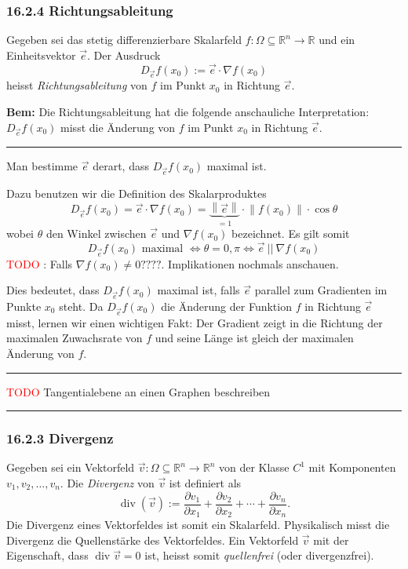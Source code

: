 \documentclass[a4paper,landscape,8pt]{extarticle}
\newcommand{\R}{\mathbb{R}}
\newcommand{\norm}[1]{\left\lVert #1 \right\rVert}
\newcommand{\todo}{\textcolor{red}{TODO }}
\newcommand{\sep}{\vspace{5pt}\noindent\hrule\vspace{5pt}}
\newcommand{\Bem}{\textbf{Bem: }}
\renewcommand\div{\operatorname{div}}
\begin{document}
\begin{multicols*}{4}
\subsubsection{16.2.4 Richtungsableitung}

\Def Gegeben sei das stetig differenzierbare Skalarfeld
$f\colon\Omega\subseteq\R^n\to\R$ und ein Einheitsvektor $\vec{e}$. Der Ausdruck
\[
D_{\vec{e}}f(x_0) := \vec{e}\cdot \nabla f(x_0)
\]
heisst \emph{Richtungsableitung} von $f$ im Punkt $x_0$ in Richtung $\vec{e}$.

\Bem Die Richtungsableitung hat die folgende anschauliche Interpretation:
$D_{\vec{e}}f(x_0)$ misst die Änderung von $f$ im Punkt $x_0$ in Richtung
$\vec{e}$.

\sep

\Bsp Man bestimme $\vec{e}$ derart, dass $D_{\vec{e}}f(x_0)$ maximal ist.

Dazu benutzen wir die Definition des Skalarproduktes
\[
D_{\vec{e}}f(x_0) = \vec{e}\cdot \nabla f(x_0) =
\underbrace{\norm{\vec{e}}}_{=1}\cdot \norm{f(x_0)}\cdot \cos \theta
\]
wobei $\theta$ den Winkel zwischen $\vec{e}$ und $\nabla f(x_0)$ bezeichnet. Es
gilt somit
\[
D_{\vec{e}}f(x_0) \text{ maximal } \Longleftrightarrow \theta = 0, \pi
\Longleftrightarrow \vec{e} \ || \ \nabla f(x_0)
\]
\todo: Falls $\nabla f(x_0)\neq 0????$. Implikationen nochmals anschauen.

Dies bedeutet, dass $D_{\vec{e}}f(x_0)$ maximal ist, falls $\vec{e}$ parallel
zum Gradienten im Punkte $x_0$ steht. Da $D_{\vec{e}}f(x_0)$ die Änderung der
Funktion $f$ in Richtung $\vec{e}$ misst, lernen wir einen wichtigen Fakt: Der
Gradient zeigt in die Richtung der maximalen Zuwachsrate von $f$ und seine Länge
ist gleich der maximalen Änderung von $f$.

\sep

\begin{warmup}
\todo Tangentialebene an einen Graphen beschreiben
\sep
\end{warmup}

\subsubsection{16.2.3 Divergenz}

\Def Gegeben sei ein Vektorfeld $\vec{v}\colon\Omega\subseteq\R^n\to\R^n$ von
der Klasse $C^1$ mit Komponenten $v_1,v_2,\ldots,v_n$. Die \emph{Divergenz} von
$\vec{v}$ ist definiert als
\[
\div(\vec{v}) := 
\frac{\partial{v_1}}{\partial{x_1}} +
\frac{\partial{v_2}}{\partial{x_2}} + \cdots +
\frac{\partial{v_n}}{\partial{x_n}}.
\]
Die Divergenz eines Vektorfeldes ist somit ein Skalarfeld. Physikalisch misst
die Divergenz die Quellenstärke des Vektorfeldes. Ein Vektorfeld $\vec{v}$ mit
der Eigenschaft, dass $\div{\vec{v}}=0$ ist, heisst somit \emph{quellenfrei}
(oder divergenzfrei).


\end{multicols*}
\end{document}
